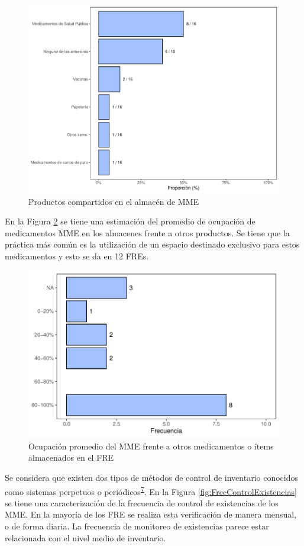 \documentclass[
]{book}
\begin{document}
\begin{figure}
\includegraphics[width=0.85\linewidth]{InformeFinal_files/figure-latex/ProductosCompartidos1-1} \caption{Productos compartidos en el almacén de MME}\label{fig:ProductosCompartidos1}
\end{figure}

En la Figura \ref{fig:PropOcupacionAlmacen} se tiene una estimación del promedio de ocupación de medicamentos MME en los almacenes frente a otros productos. Se tiene que la práctica más común es la utilización de un espacio destinado exclusivo para estos medicamentos y esto se da en 12 FREs.

\begin{figure}
\includegraphics[width=0.85\linewidth]{InformeFinal_files/figure-latex/PropOcupacionAlmacen-1} \caption{Ocupación promedio del MME frente a otros medicamentos o ítems almacenados en el FRE}\label{fig:PropOcupacionAlmacen}
\end{figure}

Se considera que existen dos tipos de métodos de control de inventario conocidos como sistemas perpetuos o periódicos\textsuperscript{\protect\hyperlink{ref-Silver2017}{7}}.
En la Figura \ref{fig:FrecControlExistencias} se tiene una caracterización de la frecuencia de control de existencias de los MME. En la mayoría de los FRE se realiza esta verificación de manera mensual, o de forma diaria. La frecuencia de monitoreo de existencias parece estar relacionada con el nivel medio de inventario.
\end{document}
